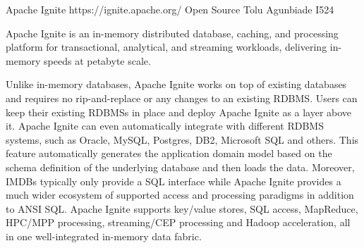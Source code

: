 Apache Ignite 
https://ignite.apache.org/ 
Open Source 
Tolu Agunbiade 
I524

Apache Ignite is an in-memory distributed database, caching, and processing
platform for transactional, analytical, and streaming workloads, delivering
in-memory speeds at petabyte scale\cite{Apache Ignite}.

Unlike in-memory databases, Apache Ignite works on top of existing databases and
requires no rip-and-replace or any changes to an existing RDBMS. Users can keep
their existing RDBMSs in place and deploy Apache Ignite as a layer above it.
Apache Ignite can even automatically integrate with different RDBMS systems,
such as Oracle, MySQL, Postgres, DB2, Microsoft SQL and others. This feature
automatically generates the application domain model based on the schema
definition of the underlying database and then loads the data. Moreover, IMDBs
typically only provide a SQL interface while Apache Ignite provides a much wider
ecosystem of supported access and processing paradigms in addition to ANSI SQL.
Apache Ignite supports key/value stores, SQL access, MapReduce, HPC/MPP
processing, streaming/CEP processing and Hadoop acceleration, all in one
well-integrated in-memory data fabric\cite{GridGain}.
